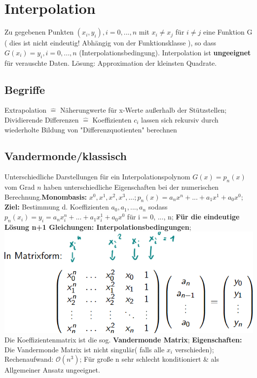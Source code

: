 \section{Interpolation}
Zu gegebenen Punkten $ ( x_{i}, y_{i} ), i=0, ..., n $ mit $ x_{i} \neq x_{j} $ für $ i \neq  j $ eine Funktion G ( dies ist nicht eindeutig! Abhängig von der Funktionsklasse ), so dass $ G ( x_{i} ) = y_{i}, i=0, ..., n $ (Interpolationsbedingung). Interpolation ist \textbf{ungeeignet} für verauschte Daten. Lösung: Approximation der kleinsten Quadrate.

\subsection{Begriffe}
Extrapolation $\hat{=} $ Näherungwerte für x-Werte außerhalb der Stützstellen;\\
Dividierende Differenzen $\hat{=}$ Koeffizienten $ c_{i} $ lassen sich rekursiv durch wiederholte Bildung von "Differenzquotienten" berechnen
\subsection{Vandermonde/klassisch}
Unterschiedliche Darstellungen für ein Interpolationspolynom $ G(x) = p_{n}(x) $ vom Grad $ n $ haben unterschiedliche Eigenschaften bei der numerischen Berechnung.\textbf{Monombasis:} $ x^{0}, x^{1}, x^{2}, x^{3}, ...; p_{n}(x) = a_{n} x^n + ... + a_{1} x^{1} + a_{0} x^{0} $; 
\textbf{Ziel:} Bestimmung d. Koeffizienten $ a_{0}, a_{1}, ..., a_{n} $ sodass $ p_{n}( x_{i} ) = y_{i} = a_{n} x_{i}^n + ... + a_{1} x_{i}^1 +a_{0} x^{0} $ für i = 0, ..., n; 
\textbf{Für die eindeutige Lösung n+1 Gleichungen: Interpolationsbedingungen};
\includegraphics[scale=0.25]{./pic/VandermondeMatrix.png}
Die Koeffizientenmatrix ist die sog. \textbf{Vandermonde Matrix}; \textbf{Eigenschaften:} Die Vandermonde Matrix ist nicht singulär( falls alle $ x_{i} $ verschieden); Rechenaufwand: $ \mathcal O ( n^{3} ) $; Für große n sehr schlecht konditioniert \& als Allgemeiner Ansatz ungeeignet.

